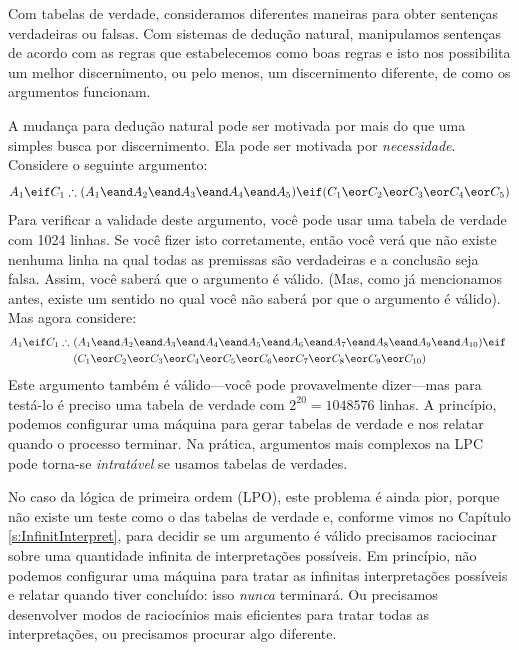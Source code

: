 Com tabelas de verdade,  consideramos diferentes maneiras  para obter sentenças verdadeiras ou falsas. Com sistemas de dedução natural, manipulamos  sentenças de acordo com as regras que estabelecemos como boas regras e isto nos possibilita um melhor discernimento, ou pelo menos, um discernimento diferente,  de como os argumentos funcionam. 

A mudança para dedução natural pode ser motivada por mais do que uma simples busca por discernimento. Ela pode ser motivada por  \emph{necessidade}. Considere o seguinte argumento:
$$A_1 \eif C_1 \therefore (A_1 \eand A_2 \eand A_3 \eand A_4 \eand A_5) \eif (C_1 \eor C_2 \eor C_3 \eor C_4 \eor C_5)$$
Para verificar a validade deste argumento, você   pode usar uma tabela de verdade com 1024 linhas. Se você fizer isto corretamente, então você verá que  não existe nenhuma linha na qual todas as premissas são verdadeiras e a conclusão seja falsa.  Assim, você saberá que o argumento é válido.  (Mas,  como  já mencionamos antes, existe um sentido no qual você não saberá por que o argumento é válido). Mas agora considere: 
\begin{align*}
A_1 \eif C_1 \therefore\ & (A_1 \eand A_2 \eand A_3 \eand A_4 \eand A_5 \eand A_6 \eand A_7 \eand A_8 \eand A_9 \eand A_{10}) \eif \phantom{(}\\
&(C_1 \eor C_2 \eor C_3 \eor C_4 \eor C_5 \eor C_6 \eor C_7 \eor C_8 \eor C_9 \eor C_{10})
\end{align*}
Este argumento também é válido---você pode provavelmente dizer---mas para testá-lo é preciso uma tabela de verdade com
 $2^{20} = 1048576$ linhas.  A princípio, podemos configurar uma máquina para gerar tabelas de verdade e nos relatar quando o processo terminar. Na prática, argumentos mais complexos na LPC pode torna-se \emph{intratável} se usamos tabelas de verdades. 
 

No caso da lógica de primeira ordem (LPO), este problema é ainda pior, porque não existe um teste como o das tabelas de verdade e, conforme vimos no Capítulo \ref{s:InfinitInterpret}, para decidir se um argumento é válido precisamos raciocinar sobre uma quantidade infinita de interpretações possíveis.
Em princípio, não podemos configurar uma máquina para tratar as infinitas interpretações possíveis e relatar quando tiver concluído:  isso \emph{nunca} terminará. Ou precisamos desenvolver modos de raciocínios mais eficientes para tratar todas as interpretações, ou precisamos procurar algo diferente. 

